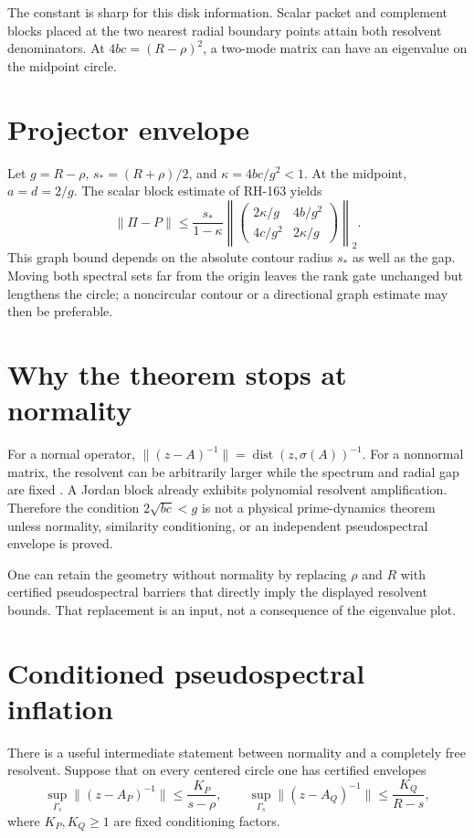\documentclass[12pt]{article}
\newcommand{\norm}[1]{\lVert#1\rVert}
\begin{document}
The constant is sharp for this disk information.  Scalar packet and
complement blocks placed at the two nearest radial boundary points attain
both resolvent denominators.  At $4bc=(R-\rho)^2$, a two-mode matrix can have
an eigenvalue on the midpoint circle.

\section{Projector envelope}
Let $g=R-\rho$, $s_*=(R+\rho)/2$, and
$\kappa=4bc/g^2<1$.  At the midpoint, $a=d=2/g$.  The scalar block estimate
of RH-163 yields
\[
 \norm{\Pi-P}\le
 \frac{s_*}{1-\kappa}
 \left\|
 \begin{pmatrix}
 2\kappa/g&4b/g^2\\
 4c/g^2&2\kappa/g
 \end{pmatrix}\right\|_2.
\]
This graph bound depends on the absolute contour radius $s_*$ as well as the
gap.  Moving both spectral sets far from the origin leaves the rank gate
unchanged but lengthens the circle; a noncircular contour or a directional
graph estimate may then be preferable.

\section{Why the theorem stops at normality}
For a normal operator,
$\norm{(z-A)^{-1}}=\operatorname{dist}(z,\sigma(A))^{-1}$.
For a nonnormal matrix, the resolvent can be arbitrarily larger while the
spectrum and radial gap are fixed \citep{TrefethenEmbree2005}.  A Jordan
block already exhibits polynomial resolvent amplification.  Therefore the
condition $2\sqrt{bc}<g$ is not a physical prime-dynamics theorem unless
normality, similarity conditioning, or an independent pseudospectral
envelope is proved.

One can retain the geometry without normality by replacing $\rho$ and $R$
with certified pseudospectral barriers that directly imply the displayed
resolvent bounds.  That replacement is an input, not a consequence of the
eigenvalue plot.

\section{Conditioned pseudospectral inflation}
There is a useful intermediate statement between normality and a completely
free resolvent.  Suppose that on every centered circle one has certified
envelopes
\[
 \sup_{\Gamma_s}\norm{(z-A_P)^{-1}}
 \le\frac{K_P}{s-\rho},\qquad
 \sup_{\Gamma_s}\norm{(z-A_Q)^{-1}}
 \le\frac{K_Q}{R-s},
\]
where $K_P,K_Q\ge1$ are fixed conditioning factors.
\end{document}
